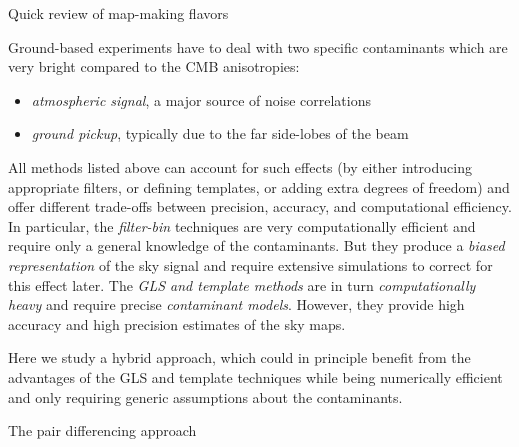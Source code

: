 \documentclass[final]{beamer}
\newlength{\colwidth}
\begin{document}
\begin{frame}[t]
\begin{columns}[t]
\begin{column}{\colwidth}
\begin{block}{Quick review of map-making flavors}

        Ground-based experiments have to deal with two specific contaminants which are very bright compared to the CMB anisotropies:

        \begin{itemize}
          \item \emph{atmospheric signal}, a major source of noise correlations
          \item \emph{ground pickup}, typically due to the far side-lobes of the beam
        \end{itemize}


        All methods listed above can account for such effects (by either introducing appropriate filters, or defining templates, or adding extra degrees of freedom) and offer different trade-offs between precision, accuracy, and computational efficiency.
        In particular, the \emph{filter-bin} techniques are very computationally efficient and require only a general knowledge of the contaminants.
        But they produce a \emph{biased representation} of the sky signal and require extensive simulations to correct for this effect later.
        The \emph{GLS and template methods} are in turn \emph{computationally heavy} and require precise \emph{contaminant models}.
        However, they provide high accuracy and high precision estimates of the sky maps.

        Here we study a hybrid approach, which could in principle benefit from the advantages of the GLS and template techniques while being numerically efficient and only requiring generic assumptions about the contaminants.

      \end{block}

      \begin{alertblock}{The pair differencing approach}


\end{alertblock}
\end{column}
\end{columns}
\end{frame}
\end{document}
